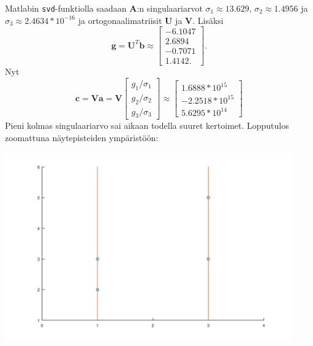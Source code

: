 \documentclass{article}
\begin{document}
Matlabin \verb#svd#-funktiolla saadaan $\mathbf{A}$:n singulaariarvot
$\sigma_1 \approx 13.629$, $\sigma_2 \approx 1.4956$ ja $\sigma_3 \approx 2.4634*10^{-16}$
ja ortogonaalimatriisit $\mathbf{U}$ ja $\mathbf{V}$.
Lisäksi 
\[
  \mathbf{g} = \mathbf{U}^T\mathbf{b} \approx \begin{bmatrix}
    -6.1047 \\ 2.6894 \\ -0.7071 \\ 1.4142.
  \end{bmatrix}.
\]
Nyt
\[
  \mathbf{c} = \mathbf{V}\mathbf{a} = \mathbf{V}\begin{bmatrix}
    g_1 / \sigma_1 \\ g_2 / \sigma_2 \\ g_3 / \sigma_3
  \end{bmatrix}
  \approx \begin{bmatrix}
    1.6888*10^{15} \\ -2.2518*10^{15} \\ 5.6295*10^{14}
  \end{bmatrix}
\]
Pieni kolmas singulaariarvo sai aikaan todella suuret kertoimet.
Lopputulos zoomattuna näytepisteiden ympäristöön:

\includegraphics[width=350pt]{w4_7b.jpg}
\end{document}
